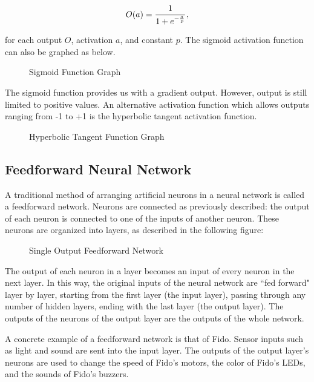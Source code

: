 \begin{equation}
	O(a) = \cfrac{1}{1+e^{-\frac{a}{p}}}
	\,,
\end{equation}

\noindent for each output $O$, activation $a$, and constant $p$. The sigmoid activation function can also be graphed as below.

\begin{figure}[ht]
	\centering
	
	\caption{Sigmoid Function Graph}
\end{figure}

The sigmoid function provides us with a gradient output. However, output is still limited to positive values. An alternative activation function which allows outputs ranging from -1 to +1 is the hyperbolic tangent activation function.

\begin{figure}[ht]
	\centering
	
	\caption{Hyperbolic Tangent Function Graph}
\end{figure}

\subsection{Feedforward Neural Network}

A traditional method of arranging artificial neurons in a neural network is called a feedforward network. Neurons are connected as previously described: the output of each neuron is connected to one of the inputs of another neuron. These neurons are organized into layers, as described in the following figure:

\begin{figure}[ht]
	\centering
	
	\caption{Single Output Feedforward Network}
\end{figure}

The output of each neuron in a layer becomes an input of every neuron in the next layer. In this way, the original inputs of the neural network are ``fed forward" layer by layer, starting from the first layer (the input layer), passing through any number of hidden layers, ending with the last layer (the output layer). The outputs of the neurons of the output layer are the outputs of the whole network.

A concrete example of a feedforward network is that of Fido. Sensor inputs such as light and sound are sent into the input layer. The outputs of the output layer's neurons are used to change the speed of Fido's motors, the color of Fido's LEDs, and the sounds of Fido's buzzers.